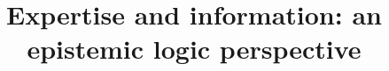 \documentclass[sn-apa]{sn-jnl}%
\theoremstyle{thmstyleone}%
\theoremstyle{thmstyletwo}%
\theoremstyle{thmstylethree}%
\begin{document}
\newcommand{\papertitle}{Expertise and information: an epistemic logic perspective}

\title[\papertitle]{\papertitle}

\author[1]{ }

\abstract{
    
}


\maketitle



%
\end{document}
